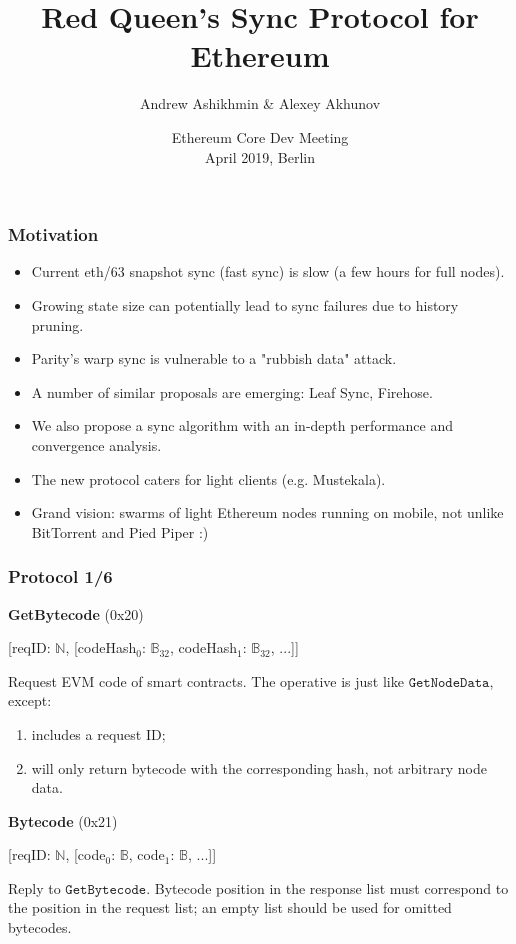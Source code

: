 \documentclass{beamer}
\title{Red Queen's Sync Protocol for Ethereum}
\author{Andrew Ashikhmin \& Alexey Akhunov}
\date{Ethereum Core Dev Meeting\\ April 2019, Berlin}
\begin{document}
  \frame{\titlepage}

  \begin{frame}
    \frametitle{Motivation}
    \begin{itemize}
      \item Current eth/63 snapshot sync (fast sync) is slow (a few hours for full nodes).
      \item Growing state size can potentially lead to sync failures due to history pruning.
      \item Parity's warp sync is vulnerable to a "rubbish data" attack.
      \item A number of similar proposals are emerging: Leaf Sync, Firehose.
      \item We also propose a sync algorithm with an in-depth performance and convergence analysis.
      \item The new protocol caters for light clients (e.g. Mustekala).
      \item Grand vision: swarms of light Ethereum nodes running on mobile, not unlike BitTorrent and Pied Piper :)
      \end{itemize}
  \end{frame}

  \begin{frame}
    \frametitle{Protocol 1/6}

    \textbf{GetBytecode} (0x20)

    [reqID: $\mathbb{N}$,
    [codeHash$_0$: $\mathbb{B}_{32}$, codeHash$_1$: $\mathbb{B}_{32}$, ...]]
    \medskip
    
    Request EVM code of smart contracts.
    The operative is just like $\texttt{GetNodeData}$, except:
    \begin{enumerate}
    \item includes a request ID;
    \item will only return bytecode with the corresponding hash, not arbitrary node data.
    \end{enumerate}
    \bigskip
    
    \textbf{Bytecode} (0x21)
    
    [reqID: $\mathbb{N}$,
    [code$_0$: $\mathbb{B}$, code$_1$: $\mathbb{B}$, ...]]
    \medskip
    
    Reply to $\texttt{GetBytecode}$.
    Bytecode position in the response list must correspond to the position in the request list;
    an empty list should be used for omitted bytecodes.

  \end{frame}
\end{document}

